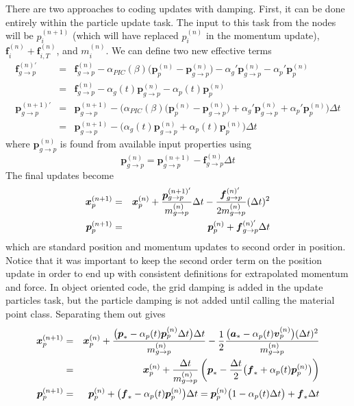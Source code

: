 \documentclass[11pt]{article}
\renewcommand{\vec}[1]{\boldsymbol{#1}}
\begin{document}
There are two approaches to coding updates with damping. First, it can be done entirely within the particle update task. The input to this task from  the nodes will be $p_i^{(n+1)}$ (which will have replaced $p_i^{(n)}$ in the momentum update), $ \vec f_{i}^{(n)} + \vec f_{i,T}^{(n)}$, and  $m_i^{(n)}$. We can define two new effective terms
\begin{eqnarray}
    \vec{f}_{g\to p}^{(n)'} & = &  \vec{f}_{g\to p}^{(n)} - \alpha_{PIC}(\beta)\bigl(\vec p_p^{(n)}-\vec p_{g\to p}^{(n)}\bigr)
         -  \alpha_g'\vec{p}_{g\to p}^{(n)} -  \alpha_p'\vec{p}_p^{(n)} \\
         & = & \vec{f}_{g\to p}^{(n)} -  \alpha_g(t)\vec{p}_{g\to p}^{(n)} -  \alpha_p(t)\vec{p}_p^{(n)}  \\
    \vec p_{g\to p}^{(n+1)'} & = & \vec p_{g\to p}^{(n+1)} - \biggl(\alpha_{PIC}(\beta)\bigl(\vec p_p^{(n)}-\vec p_{g\to p}^{(n)}\bigr)
         +  \alpha_g'\vec{p}_{g\to p}^{(n)} + \alpha_p'\vec{p}_p^{(n)}\biggr)\Delta t \\
         & = & \vec p_{g\to p}^{(n+1)} - \biggl( \alpha_g(t)\vec{p}_{g\to p}^{(n)} + \alpha_p(t)\vec{p}_p^{(n)}\biggr)\Delta t
\end{eqnarray}
where $\vec p_{g\to p}^{(n)}$ is found from available input properties using
\begin{equation}
 \vec p_{g\to p}^{(n)}  =  \vec p_{g\to p}^{(n+1)}  - \vec{f}_{g\to p}^{(n)}\Delta t
\end{equation}
The final updates become
\begin{eqnarray}
   \vec{x}_{p}^{(n+1)} & = & \vec{x}_p^{(n)} + {\vec p_{g\to p}^{(n+1)'}\over m_{g\to p}^{(n)}} \Delta t 
      - {\vec{f}_{g\to p}^{(n)'}\over 2m_{g\to p}^{(n)}}(\Delta t)^2  \\
   \vec{p}_{p}^{(n+1)} & = & \vec{p}_p^{(n)} + \vec{f}_{g\to p}^{(n)'}\Delta t 
\end{eqnarray}
which are standard position and momentum updates to second order in position. Notice that it was important to keep the second order term on the position update in order to end up with consistent definitions for extrapolated momentum and force. In object oriented code, the grid damping is added in the update particles task, but the particle damping is not added until calling the material point class. Separating them out gives
\begin{eqnarray}
   \vec{x}_{p}^{(n+1)} & = & \vec{x}_p^{(n)} +{\bigl(\vec p_* - \alpha_p(t)\vec{p}_p^{(n)}\Delta t\bigr)\Delta t \over m_{g\to p}^{(n)}}- {1\over 2}{\bigl(\vec{a}_* -  \alpha_p(t)\vec{v}_p^{(n)} \bigr)(\Delta t)^2 \over m_{g\to p}^{(n)}} \\
      & = & \vec{x}_p^{(n)} +{\Delta t\over m_{g\to p}^{(n)}}\left(\vec p_* - {\Delta t\over 2}\bigl(\vec{f}_* +  \alpha_p(t)\vec{p}_p^{(n)} \bigr)\right)  \\
   \vec{p}_{p}^{(n+1)} & = & \vec{p}_p^{(n)} +\bigl(\vec{f}_* -  \alpha_p(t)\vec{p}_p^{(n)} \bigr)\Delta t 
           =  \vec{p}_p^{(n)}\bigl(1 -  \alpha_p(t)\Delta t \bigr)  + \vec{f}_* \Delta t
\end{eqnarray}
\end{document}
